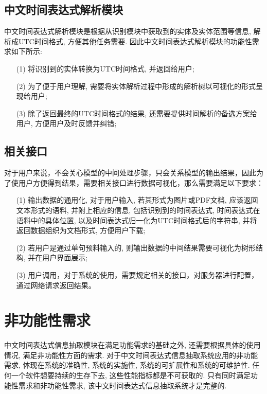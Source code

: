 \subsection{中文时间表达式解析模块}

中文时间表达式解析模块是根据从识别模块中获取到的实体及实体范围等信息, 解析成UTC时间格式, 方便其他任务需要.
因此中文时间表达式解析模块的功能性需求如下所示:
\begin{enumerate}
    \item[(1)] 将识别到的实体转换为UTC时间格式, 并返回给用户;
    \item[(2)] 为了便于用户理解, 需要将实体解析过程中形成的解析树以可视化的形式呈现给用户;
    \item[(3)] 除了返回最终的UTC时间格式的结果, 还需要提供时间解析的备选方案给用户, 方便用户及时反馈并纠错;
\end{enumerate}

\subsection{相关接口}

对于用户来说，不会关心模型的中间处理步骤，只会关系模型的输出结果，因此为了使用户方便得到结果，需要相关接口进行数据可视化，那么需要满足以下要求：
\begin{enumerate}
    \item[(1)] 输出数据的通用化, 对于用户输入, 若其形式为图片或PDF文档, 应该返回文本形式的语料, 并附上相应的信息, 包括识别到的时间表达式, 时间表达式在语料中的具体位置, 以及时间表达式归一化为UTC时间格式后的字符串, 并将返回数据组织为文档形式, 方便用户下载;
    \item[(2)] 若用户是通过单句预料输入的, 则输出数据的中间结果需要可视化为树形结构, 并在用户界面展示;
    \item[(3)]  用户调用，对于系统的使用，需要规定相关的接口，对服务器进行配置，通过网络请求返回结果。
\end{enumerate}

\section{非功能性需求}

中文时间表达式信息抽取模块在满足功能需求的基础之外, 还需要根据具体的使用情况, 满足非功能性方面的需求.
对于中文时间表达式信息抽取系统应用的非功能需求, 体现在系统的准确性, 系统的实施性, 系统的可扩展性和系统的可维护性.
任何一个软件想要持续的生存下去, 这些性能指标都是不可获取的. 只有同时满足功能性需求和非功能性需求, 该中文时间表达式信息抽取系统才是完整的.

